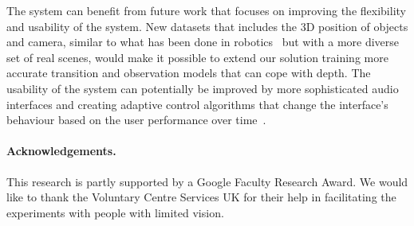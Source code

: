 \documentclass[runningheads]{llncs}
\DeclareRobustCommand{\tofix}[1]{{\sethlcolor{yellow}\hl{[#1]}}}
\begin{document}
The system can benefit from future work that focuses on improving the flexibility and usability of the system. 
New datasets that includes the 3D position of objects and camera, similar to what has been done in robotics~\cite{active2017dataset} but with a more diverse set of real scenes, would make it possible to extend our solution training more accurate transition and observation models that can cope with depth.
The usability of the system can potentially be improved by more sophisticated audio interfaces and creating adaptive control algorithms that change the interface's behaviour based on the user performance over time~\cite{gallina2015}.  


\paragraph{{\bf Acknowledgements.}}\label{sec:acknowledge}
This research is partly supported by a Google Faculty Research Award.
We would like to thank the Voluntary Centre Services UK for their help in facilitating the experiments with people with limited vision. 



\end{document}
